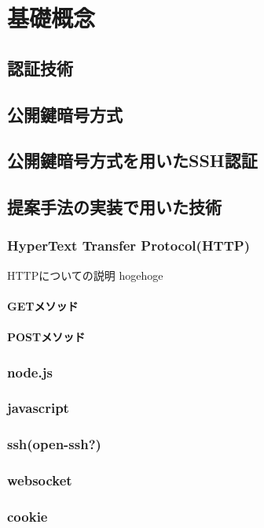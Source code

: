 \chapter{基礎概念}
\label{chap:concept}

\section{認証技術}
\section{公開鍵暗号方式}
\section{公開鍵暗号方式を用いたSSH認証}

\section{提案手法の実装で用いた技術}
    \subsection{HyperText Transfer Protocol(HTTP)}
        HTTPについての説明 hogehoge
        \subsubsection{GETメソッド}
        \subsubsection{POSTメソッド}
    \subsection{node.js}
    \subsection{javascript}
    \subsection{ssh(open-ssh?)}
    \subsection{websocket}
    \subsection{cookie}
